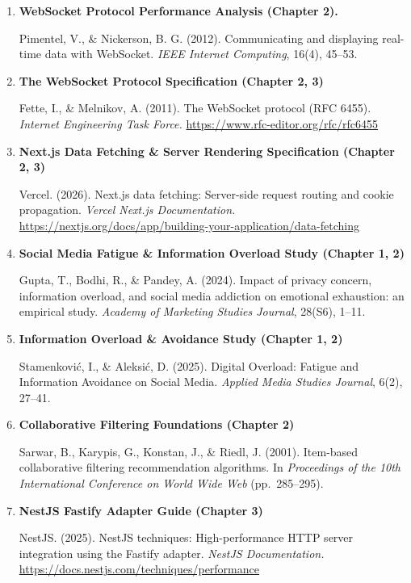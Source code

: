 \begin{enumerate}[leftmargin=*, label=\arabic*., itemsep=0.8em]
  \item \textbf{WebSocket Protocol Performance Analysis (Chapter 2).}

  Pimentel, V., \& Nickerson, B. G. (2012). Communicating and displaying real-time data with WebSocket. \textit{IEEE Internet Computing}, 16(4), 45--53.

  \item \textbf{The WebSocket Protocol Specification (Chapter 2, 3)}

  Fette, I., \& Melnikov, A. (2011). The WebSocket protocol (RFC 6455). \textit{Internet Engineering Task Force.} \url{https://www.rfc-editor.org/rfc/rfc6455}

  \item \textbf{Next.js Data Fetching \& Server Rendering Specification (Chapter 2, 3)}

  Vercel. (2026). Next.js data fetching: Server-side request routing and cookie propagation. \textit{Vercel Next.js Documentation.} \url{https://nextjs.org/docs/app/building-your-application/data-fetching}

  \item \textbf{Social Media Fatigue \& Information Overload Study (Chapter 1, 2)}

  Gupta, T., Bodhi, R., \& Pandey, A. (2024). Impact of privacy concern, information overload, and social media addiction on emotional exhaustion: an empirical study. \textit{Academy of Marketing Studies Journal}, 28(S6), 1--11.

  \item \textbf{Information Overload \& Avoidance Study (Chapter 1, 2)}

  Stamenkovi\'c, I., \& Aleksi\'c, D. (2025). Digital Overload: Fatigue and Information Avoidance on Social Media. \textit{Applied Media Studies Journal}, 6(2), 27--41.

  \item \textbf{Collaborative Filtering Foundations (Chapter 2)}

  Sarwar, B., Karypis, G., Konstan, J., \& Riedl, J. (2001). Item-based collaborative filtering recommendation algorithms. In \textit{Proceedings of the 10th International Conference on World Wide Web} (pp.\ 285--295).

  \item \textbf{NestJS Fastify Adapter Guide (Chapter 3)}

  NestJS. (2025). NestJS techniques: High-performance HTTP server integration using the Fastify adapter. \textit{NestJS Documentation.} \url{https://docs.nestjs.com/techniques/performance}


\end{enumerate}
